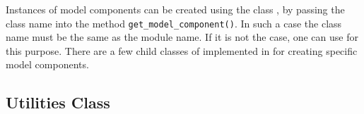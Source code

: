 {\begin{figure}[t]
\begin{center}
\end{center}
\end{figure}

Instances of model components can be created using the class
, by passing the class name into the method
\verb|get_model_component()|. In such a case the class name must be the same
as the module name. If it is not the case, one can use 
for this purpose. There are a few child classes of
 implemented in  for creating specific
model components.

\subsection{Utilities Class}
\label{sec:utilities}

}

